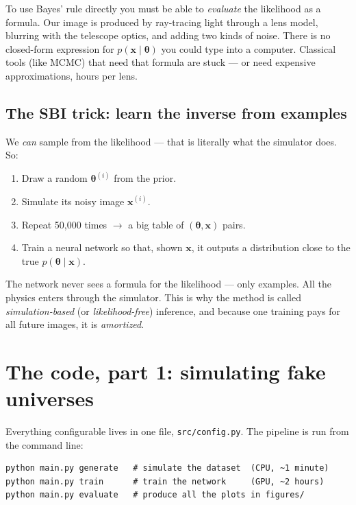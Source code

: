 \documentclass[11pt,a4paper]{article}
\begin{document}
To use Bayes' rule directly you must be able to \emph{evaluate} the likelihood as
a formula. Our image is produced by ray-tracing light through a lens model,
blurring with the telescope optics, and adding two kinds of noise. There is no
closed-form expression for $p(\mathbf{x} \mid \boldsymbol\theta)$ you could type
into a computer. Classical tools (like MCMC) that need that formula are stuck ---
or need expensive approximations, hours per lens.

\subsection{The SBI trick: learn the inverse from examples}

We \emph{can} sample from the likelihood --- that is literally what the simulator
does. So:

\begin{enumerate}
  \item Draw a random $\boldsymbol\theta^{(i)}$ from the prior.
  \item Simulate its noisy image $\mathbf{x}^{(i)}$.
  \item Repeat 50{,}000 times $\rightarrow$ a big table of
  $(\boldsymbol\theta, \mathbf{x})$ pairs.
  \item Train a neural network so that, shown $\mathbf{x}$, it outputs a
  distribution close to the true $p(\boldsymbol\theta \mid \mathbf{x})$.
\end{enumerate}

\begin{keyidea}
The network never sees a formula for the likelihood --- only examples. All the
physics enters through the simulator. This is why the method is called
\emph{simulation-based} (or \emph{likelihood-free}) inference, and because one
training pays for all future images, it is \emph{amortized}.
\end{keyidea}

\section{The code, part 1: simulating fake universes}

Everything configurable lives in one file, \texttt{src/config.py}. The pipeline
is run from the command line:

\begin{lstlisting}
python main.py generate   # simulate the dataset  (CPU, ~1 minute)
python main.py train      # train the network     (GPU, ~2 hours)
python main.py evaluate   # produce all the plots in figures/
\end{lstlisting}
\end{document}
